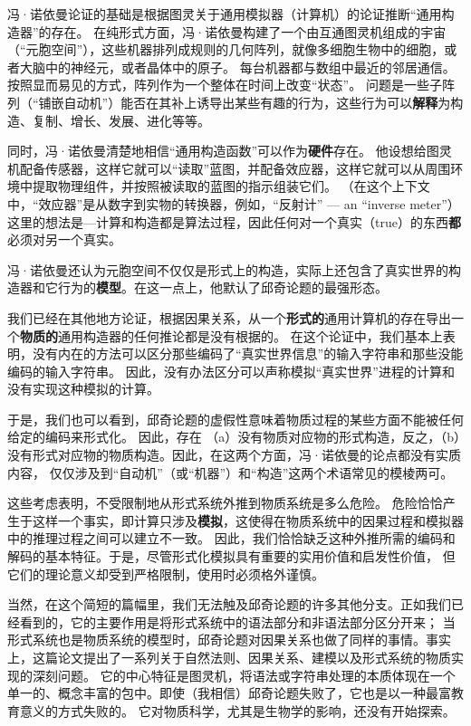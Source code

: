 \documentclass[a4paper,12pt]{article}
\begin{document}
冯·诺依曼论证的基础是根据图灵关于通用\gls{模拟器}（计算机）的论证推断“通用构造器”的存在。
在纯形式方面，冯·诺依曼构建了一个由互通\gls{图灵机}组成的宇宙（“元胞空间”），这些机器排列成规则的几何阵列，就像多细胞生物中的细胞，或者大脑中的神经元，或者晶体中的原子。
每台机器都与数组中最近的邻居通信。按照显而易见的方式，阵列作为一个整体在时间上改变“状态”。
问题是一些子阵列（“铺嵌自动机”）能否在其补上诱导出某些有趣的行为，这些行为可以\textbf{解释}为构造、复制、增长、发展、进化等等。

同时，冯·诺依曼清楚地相信“通用构造函数”可以作为\textbf{\gls{硬件}}存在。
他设想给\gls{图灵机}配备传感器，这样它就可以“读取”蓝图，并配备效应器，这样它就可以从周围环境中提取物理组件，并按照被读取的蓝图的指示组装它们。
（在这个上下文中，“效应器”是从数字到实物的\gls{转换器}，例如，“反射计” — an “inverse meter”）
这里的想法是—计算和构造都是\gls{算法过程}，因此任何对一个真实（true）的东西\textbf{都}必须对另一个真实。

冯·诺依曼还认为元胞空间不仅仅是形式上的构造，实际上还包含了真实世界的构造器和它行为的\textbf{\gls{模型}}。在这一点上，他默认了\gls{邱奇论题}的最强形态。

我们已经在其他地方\cite{RosenR1985}论证，根据\gls{因果关系}，从一个\textbf{形式的}通用计算机的存在导出一个\textbf{\gls{物质}的}通用构造器的任何推论都是没有根据的。
在这个论证中，我们基本上表明，没有内在的方法可以区分那些\gls{编码}了“真实世界信息”的输入字符串和那些没能\gls{编码}的输入字符串。
因此，没有办法区分可以声称\gls{模拟}“真实世界”进程的计算和没有实现这种\gls{模拟}的计算。

于是，我们也可以看到，\gls{邱奇论题}的虚假性意味着\gls{物质}过程的某些方面不能被任何给定的\gls{编码}来\gls{形式化}。
因此，存在 （a）没有\gls{物质}对应物的\gls{形式构造}，反之，（b）没有形式对应物的\gls{物质构造}。因此，在这两个方面，冯·诺依曼的论点都没有实质内容，
仅仅涉及到“自动机”（或“机器”）和“构造”这两个术语常见的模棱两可。

这些考虑表明，不受限制地从\gls{形式系统}外推到\gls{物质系统}是多么危险。
危险恰恰产生于这样一个事实，即计算只涉及\textbf{\gls{模拟}}，这使得在\gls{物质系统}中的\gls{因果过程}和\gls{模拟器}中的\gls{推理过程}之间可以建立不一致。
因此，我们恰恰缺乏这种外推所需的\gls{编码}和\gls{解码}的基本特征。于是，尽管\gls{形式化}\gls{模拟}具有重要的实用价值和启发性价值，
但它们的理论意义却受到严格限制，使用时必须格外谨慎。

当然，在这个简短的篇幅里，我们无法触及邱奇论题的许多其他分支。正如我们已经看到的，它的主要作用是将\gls{形式系统}中的\gls{语法}部分和非语法部分区分开来；
当\gls{形式系统}也是\gls{物质系统}的\gls{模型}时，\gls{邱奇论题}对\gls{因果关系}也做了同样的事情。事实上，这篇论文提出了一系列关于\gls{自然法则}、\gls{因果关系}、建模以及\gls{形式系统}的\gls{物质}实现的深刻问题。
它的中心特征是\gls{图灵机}，将\gls{语法}或\gls{字符串处理}的本质体现在一个单一的、概念丰富的包中。即使（我相信）\gls{邱奇论题}失败了，它也是以一种最富教育意义的方式失败的。
它对\gls{物质科学}，尤其是生物学的影响，还没有开始探索。
\end{document}
